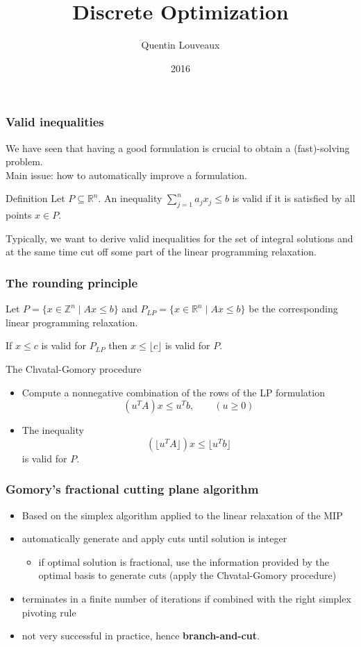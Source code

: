 \documentclass[9pt,handout]{beamer}
\title{Discrete Optimization}
\author{Quentin
Louveaux}
\institute{ULg - Institut Montefiore}
\date{2016}
\begin{document}
\begin{frame}
  \titlepage
\end{frame}
\begin{frame}
\frametitle{Valid inequalities}
We have seen that having a good formulation is \alert{crucial}
to obtain a (fast)-solving problem.\\
Main issue: how to automatically \alert{improve} a formulation.
\begin{block}{Definition}
Let $P\subseteq \mathbb R^n$. An inequality $\sum_{j=1}^n a_j x_j \leq b$
is \alert{valid} if it is satisfied by all points $x\in P$.
\end{block}
Typically, we want to derive valid inequalities for the set of
\alert{integral solutions} and at the same time \alert{cut off}
some part of the \alert{linear programming relaxation}.
\end{frame}
\begin{frame}
\frametitle{The rounding principle}
Let $P=\{x\in \mathbb Z^n \mid Ax\leq b\}$ and $P_{LP}=\{x\in \mathbb R^n \mid Ax\leq b\}$
be the corresponding linear programming relaxation.\bigskip

If $x\leq c$ is valid for \alert{$P_{LP}$} then $x\leq \lfloor c\rfloor$ is valid
for \alert{$P$}.
\begin{block}{The Chvatal-Gomory procedure}
\begin{itemize}
\item Compute a nonnegative \alert{combination} of the rows of the LP formulation
$$(u^T A) x \leq u^T b, \qquad (u\geq 0)$$
\item The inequality 
$$(\lfloor u^T A\rfloor ) x \leq \lfloor u^T b\rfloor$$
is valid for $P$.
\end{itemize}
\end{block}
\end{frame}
\begin{frame}
\frametitle{Gomory's fractional cutting plane algorithm}
  \begin{itemize}
  \item Based on the simplex algorithm applied to the linear relaxation of the MIP
  \item automatically generate and apply cuts until solution is integer
    \begin{itemize}
    \item if optimal solution is fractional, use the information provided by the optimal basis to generate cuts (apply the Chvatal-Gomory procedure)
    \end{itemize}
    \item terminates in a finite number of iterations if combined with the right \alert{simplex pivoting rule}
    \item not very successful in practice, hence \textbf{branch-and-cut}.
  \end{itemize}
\end{frame}
\end{document}
